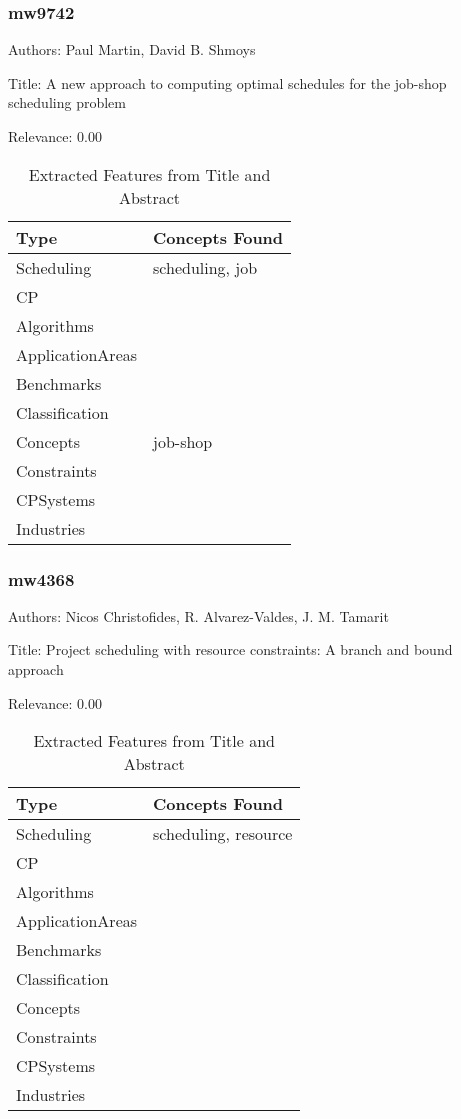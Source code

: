 \subsubsection{mw9742}
\label{mw:mw9742}

Authors: Paul Martin, David B. Shmoys

Title: A new approach to computing optimal schedules for the job-shop scheduling problem

Relevance:  0.00

{\scriptsize
\begin{longtable}{p{2cm}p{20cm}}
\caption{Extracted Features from Title and Abstract}\\ \toprule
Type & Concepts Found\\ \midrule
\endhead
\bottomrule
\endfoot
Scheduling & scheduling, job\\ 
CP & \\ 
Algorithms & \\ 
ApplicationAreas & \\ 
Benchmarks & \\ 
Classification & \\ 
Concepts & job-shop\\ 
Constraints & \\ 
CPSystems & \\ 
Industries & \\ 
\end{longtable}
}



\subsubsection{mw4368}
\label{mw:mw4368}

Authors: Nicos Christofides, R. Alvarez-Valdes, J. M. Tamarit

Title: Project scheduling with resource constraints: A branch and bound approach

Relevance:  0.00

{\scriptsize
\begin{longtable}{p{2cm}p{20cm}}
\caption{Extracted Features from Title and Abstract}\\ \toprule
Type & Concepts Found\\ \midrule
\endhead
\bottomrule
\endfoot
Scheduling & scheduling, resource\\ 
CP & \\ 
Algorithms & \\ 
ApplicationAreas & \\ 
Benchmarks & \\ 
Classification & \\ 
Concepts & \\ 
Constraints & \\ 
CPSystems & \\ 
Industries & \\ 
\end{longtable}
}



